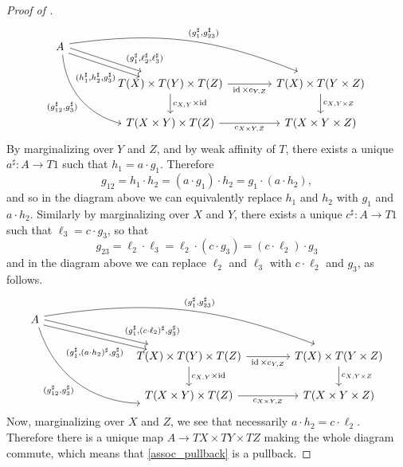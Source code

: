 \documentclass[a4paper,UKenglish,numberwithinsect,cleveref, autoref, thm-restate]{lipics-v2021}
\theoremstyle{plain} %
\theoremstyle{definition} %
\begin{document}
\begin{proof}[Proof of ]
\[\begin{tikzcd}[column sep=3.3pc]
   A \ar[bend left=15, shift left]{drr}{(g_1^\sharp,g_{23}^\sharp)} \ar[bend right=35]{ddr}[swap]{(g_{12}^\sharp,g_3^\sharp)} 
    \ar[shift left]{dr}[near end]{(g_1^\sharp,\ell_2^\sharp,\ell_3^\sharp)} \ar[shift right]{dr}[swap, pos=0.7]{(h_1^\sharp,h_2^\sharp, g_3^\sharp)} \\
   & T(X) \times T(Y) \times T(Z) \ar{r}[swap]{\id \times c_{Y,Z}} \ar{d}{c_{X,Y} \times \id}	& T(X) \times T(Y \times Z) \ar{d}{c_{X,Y \times Z}}	\\
   & T(X \times Y) \times T(Z) \ar{r}[swap]{c_{X\times Y,Z}}						& T(X \times Y \times Z)
  \end{tikzcd}
 \]
 By marginalizing over $Y$ and $Z$, and by weak affinity of $T$, there exists a unique $a^\sharp:A\to T1$ such that $h_1 = a\cdot g_1$. 
 Therefore
 \[
  g_{12} = h_1\cdot h_2 = (a\cdot g_1) \cdot h_2 = g_1\cdot (a\cdot h_2) ,
 \]
 and so in the diagram above we can equivalently replace $h_1$ and $h_2$ with $g_1$ and $a\cdot h_2$.
 Similarly by marginalizing over $X$ and $Y$, there exists a unique $c^\sharp:A\to T1$ such that $\ell_3=c\cdot g_3$, so that
 \[
  g_{23}= \ell_2\cdot\ell_3 = \ell_2\cdot (c\cdot g_3) = (c\cdot \ell_2) \cdot g_3
 \]
 and in the diagram above we can replace $\ell_2$ and $\ell_3$ with $c\cdot \ell_2$ and $g_3$, as follows.
 \[
  \begin{tikzcd}[column sep=3.3pc]
   A \ar[bend left=15, shift left]{drrr}{(g_1^\sharp,g_{23}^\sharp)} \ar[bend right=35]{ddrr}[swap]{(g_{12}^\sharp,g_3^\sharp)} 
    \ar[shift left]{drr}[near end]{(g_1^\sharp,(c\cdot\ell_2)^\sharp,g_3^\sharp)} \ar[shift right]{drr}[swap, pos=0.8]{(g_1^\sharp,(a\cdot h_2)^\sharp, g_3^\sharp)} \\
   && T(X) \times T(Y) \times T(Z) \ar{r}[swap]{\id \times c_{Y,Z}} \ar{d}{c_{X,Y} \times \id}	& T(X) \times T(Y \times Z) \ar{d}{c_{X,Y \times Z}}	\\
   && T(X \times Y) \times T(Z) \ar{r}[swap]{c_{X\times Y,Z}}						& T(X \times Y \times Z)
  \end{tikzcd}
 \]
 Now, marginalizing over $X$ and $Z$, we see that necessarily $a\cdot h_2=c\cdot \ell_2$. 
 Therefore there is a unique map $A\to TX\times TY\times TZ$ making the whole diagram commute, which means that \eqref{assoc_pullback} is a pullback.
 

\end{proof}
\end{document}
